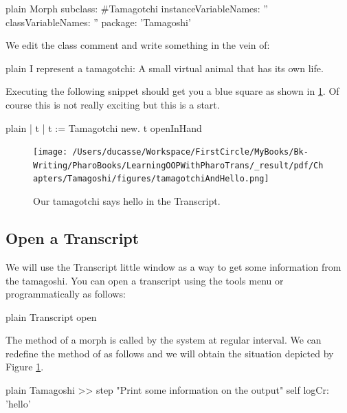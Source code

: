 \documentclass[10pt,twoside,english]{_support/latex/sbabook/sbabook}
\begin{document}
\begin{displaycode}{plain}
Morph subclass: #Tamagotchi
	instanceVariableNames: ''
	classVariableNames: ''
	package: 'Tamagoshi'
\end{displaycode}

We edit the class comment and write something in the vein of:

\begin{displaycode}{plain}
I represent a tamagotchi: A small virtual animal that has its own life.
\end{displaycode}

Executing the following snippet should get you a blue square as shown in \ref{squareTamagoshi}. Of course this is not really exciting but this is a start.

\begin{displaycode}{plain}
| t |
t := Tamagotchi new.
t openInHand
\end{displaycode}


\begin{figure}

\begin{center}
\texttt{[image: /Users/ducasse/Workspace/FirstCircle/MyBooks/Bk-Writing/PharoBooks/LearningOOPWithPharoTrans/\_result/pdf/Chapters/Tamagoshi/figures/tamagotchiAndHello.png]}\caption{Our tamagotchi says hello in the Transcript. \label{squareTamagoshi}}\end{center}
\end{figure}

\subsection{Open a Transcript}
We will use the Transcript little window as a way to get some information from the tamagoshi. You can open a transcript using the tools menu or programmatically as follows:

\begin{displaycode}{plain}
Transcript open
\end{displaycode}

The method  of a morph is called by the system at regular interval.
We can redefine the method  of  as follows and we will obtain the situation depicted by Figure \ref{squareTamagoshi}.

\begin{displaycode}{plain}
Tamagoshi >> step
	"Print some information on the output"
	self logCr: 'hello'
\end{displaycode}
\end{document}
